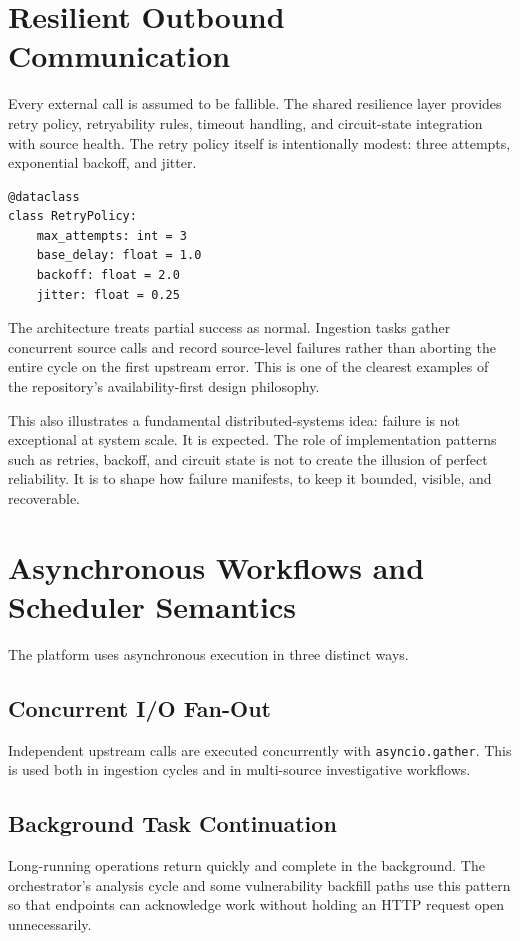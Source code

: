 \section{Resilient Outbound Communication}
Every external call is assumed to be fallible. The shared resilience layer provides retry policy, retryability rules, timeout handling, and circuit-state integration with source health. The retry policy itself is intentionally modest: three attempts, exponential backoff, and jitter.

\begin{lstlisting}[caption={Retry policy for external source calls},label={lst:retry-new}]
@dataclass
class RetryPolicy:
    max_attempts: int = 3
    base_delay: float = 1.0
    backoff: float = 2.0
    jitter: float = 0.25
\end{lstlisting}

The architecture treats partial success as normal. Ingestion tasks gather concurrent source calls and record source-level failures rather than aborting the entire cycle on the first upstream error. This is one of the clearest examples of the repository's availability-first design philosophy.

This also illustrates a fundamental distributed-systems idea: failure is not exceptional at system scale. It is expected. The role of implementation patterns such as retries, backoff, and circuit state is not to create the illusion of perfect reliability. It is to shape how failure manifests, to keep it bounded, visible, and recoverable.

\section{Asynchronous Workflows and Scheduler Semantics}
The platform uses asynchronous execution in three distinct ways.

\subsection{Concurrent I/O Fan-Out}
Independent upstream calls are executed concurrently with \texttt{asyncio.gather}. This is used both in ingestion cycles and in multi-source investigative workflows.

\subsection{Background Task Continuation}
Long-running operations return quickly and complete in the background. The orchestrator's analysis cycle and some vulnerability backfill paths use this pattern so that endpoints can acknowledge work without holding an HTTP request open unnecessarily.

